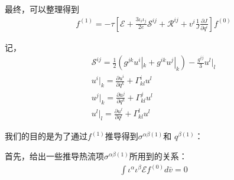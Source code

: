 \documentclass[LBMDerivation.tex]{subfiles}
\begin{document}








最终，可以整理得到
\begin{equation}
  \boxed{
    \begin{gathered}
      f^{(1)}=
      -\tau [ \mathcal{E}
        +\frac{3\iota_i \iota_j}{2e} \mathcal{S}^{ij}
        +  \mathcal{R}^{ij}  + v^i  \frac{1}{J}\frac{\partial J}{\partial q^i}
      ]{f^{(0)}}
    \end{gathered}
  }
\end{equation}




记，
\begin{equation}
  \begin{gathered}
    \mathcal{S}^{ij}=\frac{1}{2} (g^{jk} u^i|_k+g^{ik} u^j|_k) -\frac{g^{ij}}{3}u^l|_l\\
    u^i|_k= \frac{\partial u^i}{\partial q^k}+\Gamma_{kl}^i u^l\\
    u^j|_k= \frac{\partial u^j}{\partial q^k}+\Gamma_{kl}^j u^l\\
    u^l|_l= \frac{\partial u^l}{\partial q^l}+\Gamma_{kl}^l u^l
  \end{gathered}
\end{equation}


我们的目的是为了通过$f^{(1)}$推导得到$\sigma^{\alpha\beta(1)}$和 $q^{\beta (1)}$：


首先，给出一些推导热流项$ \sigma^{\alpha\beta(1)}$所用到的关系：
\begin{equation}
  \begin{gathered}
    \int \iota^\alpha \iota^\beta \mathcal{E} f^{(0)} d \bar{v}=0
  \end{gathered}
\end{equation}
\end{document}
